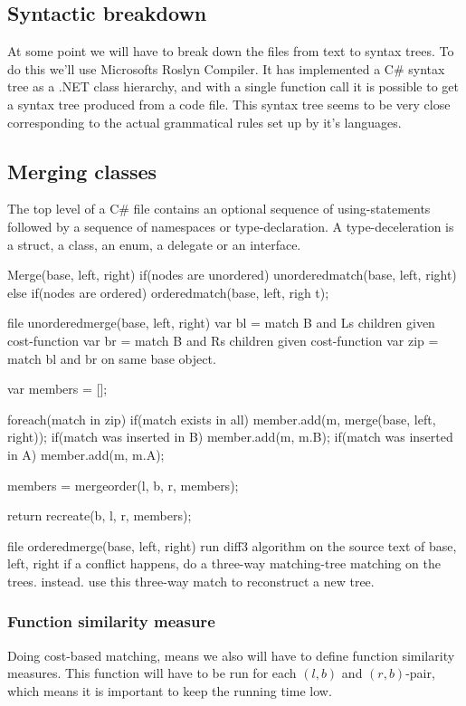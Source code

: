\documentclass[11pt]{article}
\begin{document}
\subsection{Syntactic breakdown}
At some point we will have to break down the files from text to syntax trees. To do this we'll use Microsofts Roslyn Compiler. It has implemented a C\# syntax tree as a .NET class hierarchy, and with a single function call it is possible to get a syntax tree produced from a code file. This syntax tree seems to be very close corresponding to the actual grammatical rules set up by it's languages.




\subsection{Merging classes}
The top level of a C\# file contains an optional sequence of using-statements followed by a sequence of namespaces or type-declaration. A type-deceleration is a struct, a class, an enum, a delegate or an interface.




\label{mergingclasses}
Merge(base, left, right)
    if(nodes are unordered)
        unorderedmatch(base, left, right)
    else if(nodes are ordered)
        orderedmatch(base, left, righ t);

file unorderedmerge(base, left, right)
    var bl = match B and Ls children given cost-function
    var br = match B and Rs children given cost-function
    var zip = match bl and br on same base object.

    var members = [];

    foreach(match in zip)
        if(match exists in all)
            member.add(m, merge(base, left, right));
        if(match was inserted in B)
            member.add(m, m.B);
        if(match was inserted in A)
            member.add(m, m.A);
    
    members = mergeorder(l, b, r, members);

    return recreate(b, l, r, members);
    

file orderedmerge(base, left, right)
    run diff3 algorithm on the source text of base, left, right
    if a conflict happens, do a three-way matching-tree matching on the trees. instead.
    use this three-way match to reconstruct a new tree.



\subsubsection{Function similarity measure}
Doing cost-based matching, means we also will have to define function similarity measures. This function will have to be run for each $(l, b)$ and $(r, b)$-pair, which means it is important to keep the running time low.
\end{document}
